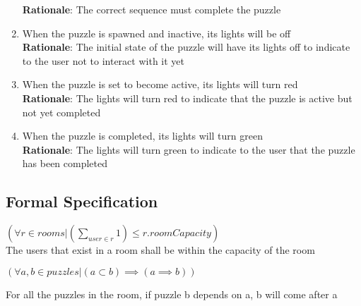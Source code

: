 \documentclass[12pt]{article}
\begin{document}
\begin{enumerate}[label=WP\arabic*., series=WiresPuzzle ]
        \textbf{Rationale}: The correct sequence must complete the puzzle
        \item When the puzzle is spawned and inactive, its lights will be off \\
        \textbf{Rationale}: The initial state of the puzzle will have its lights off to indicate to the user not to interact with it yet
        \item When the puzzle is set to become active, its lights will turn red \\
        \textbf{Rationale}: The lights will turn red to indicate that the puzzle is active but not yet completed
        \item When the puzzle is completed, its lights will turn green \\
        \textbf{Rationale}: The lights will turn green to indicate to the user that the puzzle has been completed
\end{enumerate}

\subsection{Formal Specification}
$(\forall r \in rooms  | (\sum\limits_{user \in r} 1)  \leq r.roomCapacity)$\\

The users that exist in a room shall be within the capacity of the room

$ (\forall a,b \in puzzles  |  (a \subset b) \implies (a \implies b))$
 
For all the puzzles in the room, if puzzle b depends on a, b will come after a
\end{document}
